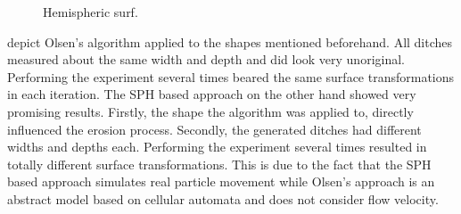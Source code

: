 \documentclass[11pt,a4paper,twoside,openright]{report}
\begin{document}
\begin{figure}[!htb]
  \caption{Hemispheric surf.}\label{fig:hydro3}
\endminipage
\end{figure}
 depict Olsen's algorithm applied to the shapes mentioned beforehand. All ditches measured about the same width and depth and did look very unoriginal. Performing the experiment several times beared the same surface transformations in each iteration. The SPH based approach on the other hand showed very promising results. Firstly, the shape the algorithm was applied to, directly influenced the erosion process. Secondly, the generated ditches had different widths and depths each. Performing the experiment several times resulted in totally different surface transformations. This is due to the fact that the SPH based approach simulates real particle movement while Olsen's approach is an abstract model based on cellular automata and does not consider flow velocity.
\end{document}
